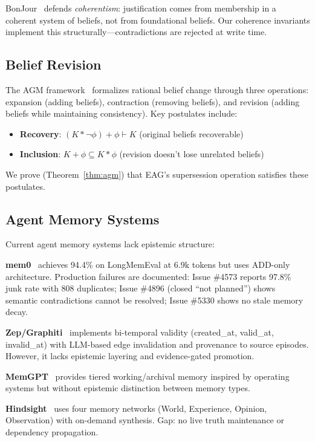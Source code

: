 \documentclass[11pt,a4paper]{article}
\begin{document}
BonJour~\cite{bonjour1985} defends \textit{coherentism}: justification comes from membership in a coherent system of beliefs, not from foundational beliefs. Our coherence invariants implement this structurally---contradictions are rejected at write time.

\subsection{Belief Revision}

The AGM framework~\cite{agm1985} formalizes rational belief change through three operations: expansion (adding beliefs), contraction (removing beliefs), and revision (adding beliefs while maintaining consistency). Key postulates include:
\begin{itemize}[noitemsep]
    \item \textbf{Recovery}: $(K * \neg\phi) + \phi \vdash K$ (original beliefs recoverable)
    \item \textbf{Inclusion}: $K + \phi \subseteq K * \phi$ (revision doesn't lose unrelated beliefs)
\end{itemize}

We prove (Theorem~\ref{thm:agm}) that EAG's supersession operation satisfies these postulates.

\subsection{Agent Memory Systems}

Current agent memory systems lack epistemic structure:

\textbf{mem0}~\cite{mem0} achieves 94.4\% on LongMemEval at 6.9k tokens but uses ADD-only architecture. Production failures are documented: Issue \#4573 reports 97.8\% junk rate with 808 duplicates; Issue \#4896 (closed ``not planned'') shows semantic contradictions cannot be resolved; Issue \#5330 shows no stale memory decay.

\textbf{Zep/Graphiti}~\cite{graphiti2025} implements bi-temporal validity (created\_at, valid\_at, invalid\_at) with LLM-based edge invalidation and provenance to source episodes. However, it lacks epistemic layering and evidence-gated promotion.

\textbf{MemGPT}~\cite{memgpt2023} provides tiered working/archival memory inspired by operating systems but without epistemic distinction between memory types.

\textbf{Hindsight}~\cite{hindsight} uses four memory networks (World, Experience, Opinion, Observation) with on-demand synthesis. Gap: no live truth maintenance or dependency propagation.
\end{document}
